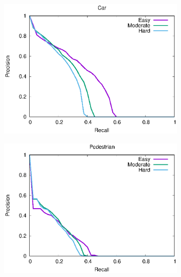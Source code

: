 \begin{figure}[H]
\begin{subfigure}{.5\textwidth}
    \includegraphics[width=1.0\linewidth]{img/yolo_Nov_9/plot_valid/car_detection.eps}
\end{subfigure}%
\begin{subfigure}{.5\textwidth}
    \centering
    \includegraphics[width=1.0\linewidth]{img/yolo_Nov_9/plot_valid/pedestrian_detection.eps}
\end{subfigure}
\caption{Using a Tiny Yolo Model Trained on Our Dataset}
\begin{subfigure}{.5\textwidth}
    \centering

\end{subfigure}
\end{figure}
